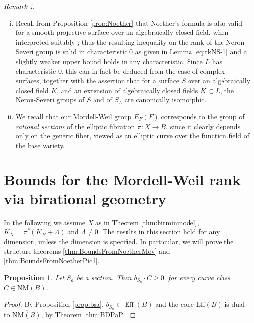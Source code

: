 \documentclass[11pt]{amsart}
\newtheorem{proposition}[theorem]{Proposition}
\theoremstyle{definition}
\theoremstyle{definition}
\theoremstyle{remark}
\newtheorem{remark}[theorem]{Remark}
\theoremstyle{remark}
\theoremstyle{definition}
\theoremstyle{conjecture}
\begin{document}
\begin{remark}\begin{enumerate}[(i)]
\item Recall from Proposition \ref{prop:Noether} that Noether's formula
is also valid for a smooth projective surface over an algebraically closed field,
when interpreted suitably \cite{PieneNoether};  thus the resulting inequality on the rank of the Neron-Severi group is valid in characteristic 0 as given in  Lemma \ref{eq:rkNS-1} and a slightly weaker upper bound holds in any characteristic.
Since $\bar{L}$ has characteristic $0$,
this can in fact be deduced from the case of complex surfaces,
together with the assertion that for a surface $S$ over an algebraically closed field $K$,
and an extension of algebraically closed fields $K\subset L$,
the Neron-Severi groups of $S$ and of $S_L$ are canonically isomorphic.
\item  
We recall that our Mordell-Weil group $E_F(F)$ corresponds to
the group of {\em rational sections} of the elliptic fibration
$\pi:X\to B$, since it clearly depends only on the generic fiber,
viewed as an elliptic curve  over the function field of the base
variety. 

\end{enumerate}
\end{remark}
 
 

 

\section{
Bounds for the Mordell-Weil rank via birational geometry
} \label{sec:geomproof}

\medskip


In the following we assume  $X$ as in Theorem \ref{thm:birminmodel}, 
$K_X = \pi^\ast(K_B + \Lambda)$ and $\Lambda \neq 0$.
The results in this
section hold for any dimension, unless the dimension is specified.
{In particular, we will prove the structure theorems \ref{thm:BoundsFromNoetherMov} and 
\ref{thm:BoundsFromNoetherPic1}.}

\begin{proposition}\label{prop:SectionMovableCurveInt}
	Let $S_a$ be a section.
	Then $
		b_{S_a}\cdot C \ge 0 \ 
		$
     for every curve class $C\in \overline{\mathrm{NM}(B)}$.

\end{proposition}

\begin{proof}  By Proposition \ref{prop:bsa}, $b_{S_a} \in \overline{\operatorname{Eff}(B)}$ and  the cone  $\overline{\mathrm{Eff}(B)}$ is dual to $\overline{\mathrm{NM}(B)}$, by Theorem \ref{thm:BDPaP}.\end{proof}
\end{document}
